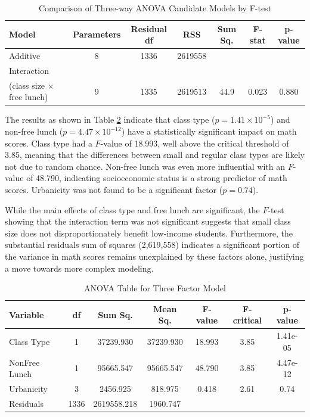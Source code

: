 \documentclass[11pt]{article}
\begin{document}
\begin{table}[htbp]
\centering
\caption{Comparison of Three-way ANOVA Candidate Models by F-test}
\label{tab:ftest}
\begin{tabular}{lccccc  c}
\toprule
\textbf{Model} & \textbf{Parameters} & \textbf{Residual df} & \textbf{RSS} & \textbf{Sum Sq.} & \textbf{F-stat} & \textbf{p-value} \\
\midrule
Additive & 8 & 1336 & 2619558 & & & \\ 
Interaction \\ (class size $\times$ free lunch) & 9 & 1335 & 2619513 & 44.9 & 0.023 & 0.880 \\
\bottomrule
\end{tabular}
\end{table}

The results as shown in Table \ref{tab:fixed_anova_results} indicate that class type ($p = 1.41 \times 10^{-5}$) and non-free lunch ($p = 4.47 \times 10^{-12}$) have a statistically significant impact on math scores. Class type had a $F$-value of 18.993, well above the critical threshold of 3.85, meaning that the differences between small and regular class types are likely not due to random chance. Non-free lunch was even more influential with an $F$-value of 48.790, indicating socioeconomic status is a strong predictor of math scores. Urbanicity was not found to be a significant factor ($p = 0.74$).  

While the main effects of class type and free lunch are significant, the $F$-test showing that the interaction term was not significant suggests that small class size does not disproportionately benefit low-income students. Furthermore, the substantial residuals sum of squares (2,619,558) indicates a significant portion of the variance in math scores remains unexplained by these factors alone, justifying a move towards more complex modeling. 


\begin{table}[htbp]
\centering
\caption{ANOVA Table for Three Factor Model}
\label{tab:fixed_anova_results}
\begin{tabular}{lcccccc}
\toprule
\textbf{Variable} & \textbf{df} & \textbf{Sum Sq.} & \textbf{Mean Sq.} & \textbf{F-value} & \textbf{F-critical} & \textbf{p-value} \\
\midrule
Class Type & 1 & 37239.930 & 37239.930 & 18.993 & 3.85 & 1.41e-05 \\
NonFree Lunch & 1 & 95665.547 & 95665.547 & 48.790 & 3.85 & 4.47e-12 \\
Urbanicity & 3 & 2456.925 & 818.975 & 0.418 & 2.61 & 0.74 \\
Residuals & 1336 & 2619558.218 & 1960.747 &  &  & \\
\bottomrule
\end{tabular}
\end{table}
\end{document}
